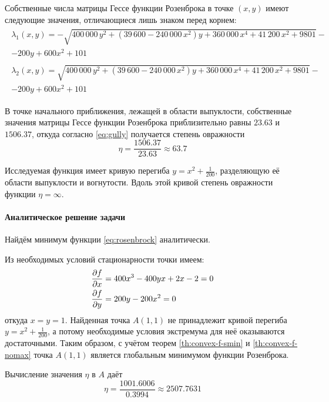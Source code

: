 Собственные числа матрицы Гессе функции Розенброка в точке $(x, y)$
имеют следующие значения, отличающиеся лишь знаком перед корнем:
\begin{gather*}
  \begin{split}
    \lambda_1(x, y) = -\sqrt{400\,000\,y^2 +
      \left(39\,600-240\,000\,x^2\right)y + 360\,000\,x^4 +
      41\,200\,x^2+9801}- \\
    - 200y+600x^2+101
  \end{split}\\
  \begin{split}
    \lambda_2(x, y) = \sqrt{400\,000\,y^2 +
      \left(39\,600-240\,000\,x^2\right)y + 360\,000\,x^4 +
      41\,200\,x^2+9801}- \\
    - 200y+600x^2+101
  \end{split}
\end{gather*}

В точке начального приближения, лежащей в области выпуклости,
собственные значения матрицы Гессе функции Розенброка приблизительно
равны $23.63$ и $1506.37$, откуда согласно \eqref{eq:gully} получается
степень овражности
\begin{equation}
  \label{eq:rosenbrock-gully-start}
  \eta = \frac{1506.37}{23.63} \approx 63.7
\end{equation}

Исследуемая функция имеет кривую перегиба $y=x^2+\frac{1}{200}$,
разделяющую её области выпуклости и вогнутости. Вдоль этой кривой
степень овражности функции $\eta = \infty$.

\paragraph{Аналитическое решение задачи}

Найдём минимум функции \eqref{eq:rosenbrock} аналитически.

Из необходимых условий стационарности точки имеем:
\begin{align*}
  \frac{\partial{f}}{\partial{x}} &= 400x^3-400yx+2x-2 = 0 \\
  \frac{\partial{f}}{\partial{y}} &= 200y-200x^2 = 0
\end{align*}
откуда $x = y = 1$. Найденная точка $A(1, 1)$ не принадлежит кривой
перегиба $y = x^2+\frac{1}{200}$, а потому необходимые условия
экстремума для неё оказываются достаточными. Таким образом, с учётом
теорем \ref{th:convex-f-smin} и \ref{th:convex-f-nomax} точка $A(1,1)$
является глобальным минимумом функции Розенброка.

Вычисление значения $\eta$ в $A$ даёт
\begin{equation}
  \label{eq:rosenbrock-gully-extr}
  \eta = \frac{1001.6006}{0.3994} \approx 2507.7631
\end{equation}

